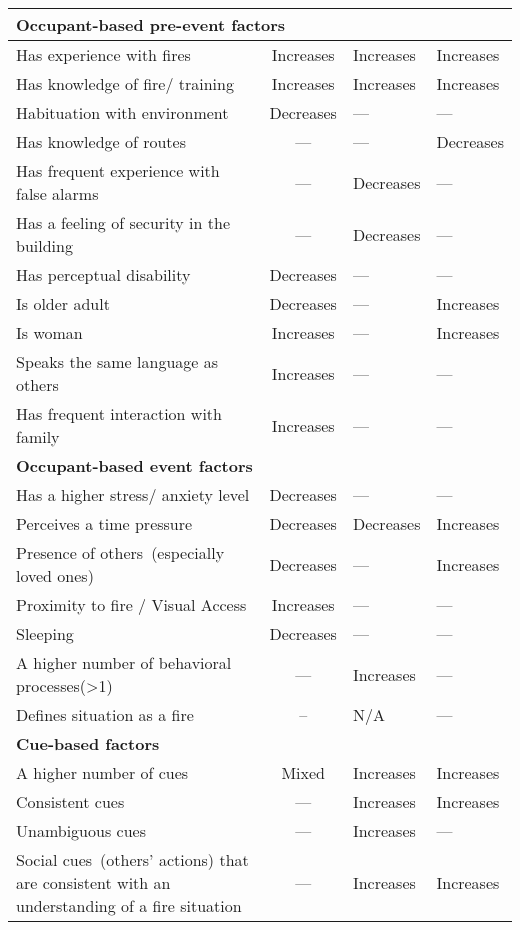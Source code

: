 \begin{table}[htbp]
\begin{threeparttable}[b]
\begin{tabular}{m{6.3cm} c >{\centering\arraybackslash}m{2.8cm} >{\centering\arraybackslash}m{2.8cm}}
\midrule
\multicolumn {4}{l}{{\bf Occupant-based pre-event factors}}\\
\midrule
Has experience with fires    & Increases  & Increases &  Increases\\
Has knowledge of fire/ training & Increases  & Increases &  Increases\\
Habituation with environment   & Decreases  & ---\tnote{1}    &  --- \\
Has knowledge of routes     &   ---   &  ---    & Decreases\\
Has frequent experience with false alarms & ---  & Decreases &  ---\\
Has a feeling of security in the building & ---  & Decreases &  ---\\
Has perceptual disability   & Decreases  & --- &  ---\\
Is older adult        & Decreases  & --- &  Increases\\
Is woman           & Increases  & --- &  Increases\\
Speaks the same language as others & Increases  & --- &  ---\\
Has frequent interaction with family & Increases  & --- &  ---\\
\midrule
\multicolumn {4}{l}{{\bf Occupant-based event factors}}\\
\midrule
Has a higher stress/ anxiety level  & Decreases & --- & --- \\
Perceives a time pressure & Decreases & Decreases & Increases \\
Presence of others~(especially loved ones) & Decreases & --- & Increases \\
Proximity to fire / Visual Access  & Increases & --- & --- \\
Sleeping & Decreases & ---& ---\\
A higher number of behavioral processes(>1) & --- & Increases & --- \\
Defines situation as a fire & -- & N/A & --- \\
\midrule
\multicolumn {4}{l}{{\bf Cue-based factors}}\\
\midrule
A higher number of cues & Mixed\tnote{2} & Increases & Increases \\
Consistent cues & --- & Increases & Increases \\
Unambiguous cues & --- & Increases & --- \\
Social cues~(others' actions) that are consistent with an understanding of a fire situation & --- & Increases & Increases \\

\end{tabular}
\end{threeparttable}
\end{table}

